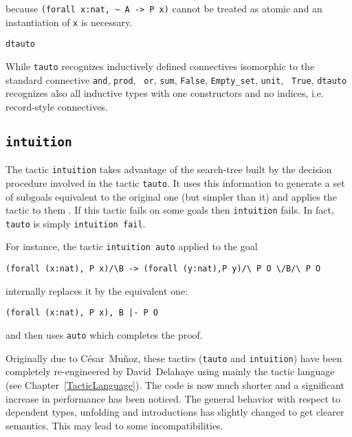 \begin{coq_example*}
because \verb=(forall x:nat, ~ A -> P x)= cannot be treated as atomic and an
instantiation of \verb=x= is necessary.

\begin{Variants}

\item {\tt dtauto}

  While {\tt tauto} recognizes inductively defined connectives
  isomorphic to the standard connective {\tt and}, {\tt prod}, {\tt
    or}, {\tt sum}, {\tt False}, {\tt Empty\_set}, {\tt unit}, {\tt
    True}, {\tt dtauto} recognizes also all inductive types with
  one constructors and no indices, i.e. record-style connectives.

\end{Variants}

\subsection{\tt intuition \tac}
\label{intuition}

The tactic \texttt{intuition} takes advantage of the search-tree built
by the decision procedure involved in the tactic {\tt tauto}. It uses
this information to generate a set of subgoals equivalent to the
original one (but simpler than it) and applies the tactic
{\tac} to them \cite{Mun94}. If this tactic fails on some goals then
{\tt intuition} fails. In fact, {\tt tauto} is simply {\tt intuition
  fail}.

For instance, the tactic {\tt intuition auto} applied to the goal
\begin{verbatim}
(forall (x:nat), P x)/\B -> (forall (y:nat),P y)/\ P O \/B/\ P O
\end{verbatim}
internally replaces it by the equivalent one:
\begin{verbatim}
(forall (x:nat), P x), B |- P O
\end{verbatim}
and then uses {\tt auto} which completes the proof.

Originally due to C{\'e}sar~Mu{\~n}oz, these tactics ({\tt tauto} and {\tt intuition})
have been completely re-engineered by David~Delahaye using mainly the tactic
language (see Chapter~\ref{TacticLanguage}). The code is now much shorter and
a significant increase in performance has been noticed. The general behavior
with respect to dependent types, unfolding and introductions has
slightly changed to get clearer semantics. This may lead to some
incompatibilities.


\end{coq_example*}

